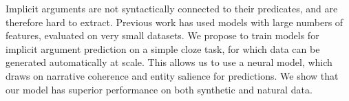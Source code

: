 Implicit arguments are not syntactically connected to their predicates, and are therefore hard to extract. Previous work has used models with large numbers of features, evaluated on very small datasets. We propose to train models for implicit argument prediction on a simple cloze task, for which data can be generated automatically at scale. This allows us to use a neural model, which draws on narrative coherence and entity salience for predictions. We show that our model has superior performance on both synthetic and natural data.
